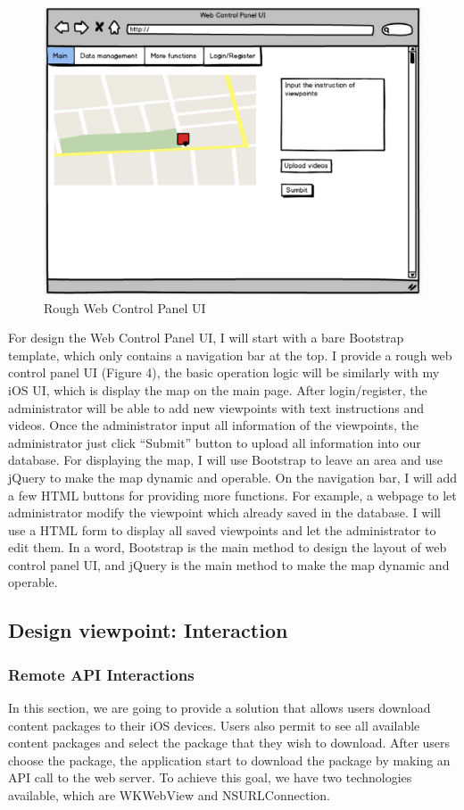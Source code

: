 \documentclass[letterpaper, 10pt,titlepage]{article}
\begin{document}
\begin{figure}[ht]
    \centering
    \includegraphics[scale=0.5]{j4}
    \caption{Rough Web Control Panel UI}
    \label{jiawei4}
\end{figure}

For design the Web Control Panel UI, I will start with a bare Bootstrap template, which only contains a navigation bar at the top. I provide a rough web control panel UI (Figure 4), the basic operation logic will be similarly with my iOS UI, which is display the map on the main page. After login/register, the administrator will be able to add new viewpoints with text instructions and videos. Once the administrator input all information of the viewpoints, the administrator just click “Submit” button to upload all information into our database. For displaying the map, I will use Bootstrap to leave an area and use jQuery to make the map dynamic and operable. On the navigation bar, I will add a few HTML buttons for providing more functions. For example, a webpage to let administrator modify the viewpoint which already saved in the database. I will use a HTML form to display all saved viewpoints and let the administrator to edit them. In a word, Bootstrap is the main method to design the layout of web control panel UI, and jQuery is the main method to make the map dynamic and operable.


\subsection{Design viewpoint: Interaction}

\subsubsection{Remote API Interactions}
In this section, we are going to provide a solution that allows users download content packages to their iOS devices. Users also permit to see all available content packages and select the package that they wish to download. After users choose the package, the application start to download the package by making an API call to the web server. To achieve this goal, we have two technologies available, which are WKWebView and NSURLConnection.
\end{document}
